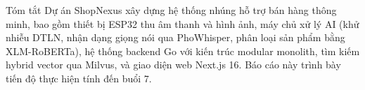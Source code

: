 \begin{preface}{Tóm tắt}
Dự án ShopNexus xây dựng hệ thống nhúng hỗ trợ bán hàng thông minh, bao gồm thiết bị ESP32 thu âm thanh và hình ảnh, máy chủ xử lý AI (khử nhiễu DTLN, nhận dạng giọng nói qua PhoWhisper, phân loại sản phẩm bằng XLM-RoBERTa), hệ thống backend Go với kiến trúc modular monolith, tìm kiếm hybrid vector qua Milvus, và giao diện web Next.js 16. Báo cáo này trình bày tiến độ thực hiện tính đến buổi 7.
\end{preface}
